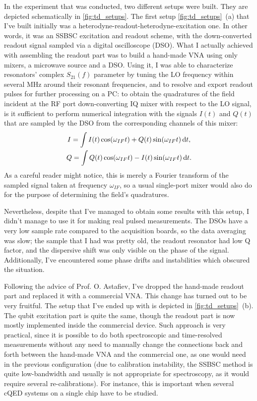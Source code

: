 In the experiment that was conducted, two different setups were built. They are depicted schematically in \autoref{fig:td_setups}. The first setup \autoref{fig:td_setups}~(a) that I've built initially was a heterodyne-readout-heterodyne-excitation one. In other words, it was an SSBSC excitation and readout scheme, with the down-converted readout signal sampled via a digital oscilloscope (DSO). What I actually achieved with assembling the readout part was to build a hand-made VNA using only mixers, a microwave source and a DSO. Using it, I was able to characterize resonators' complex $S_{21}(f)$ parameter by tuning the LO frequency within several MHz around their resonant frequencies, and to resolve and export readout pulses for further processing on a PC: to obtain the quadratures of the field incident at the RF port down-converting IQ mixer with respect to the LO signal, is it sufficient to perform numerical integration with the signals $I(t)$ and $Q(t)$ that are sampled by the DSO from the corresponding channels of this mixer:
\[
\begin{gathered}
I = \int I(t) \cos(\omega_{IF}t)+Q(t) \sin(\omega_{IF}t) \,\mathrm{d} t,\\
Q =  \int Q(t) \cos(\omega_{IF}t)-I(t) \sin(\omega_{IF}t) \,\mathrm{d} t.
\end{gathered}
\]
As a careful reader might notice, this is merely a Fourier transform of the sampled signal taken at frequency $\omega_{IF}$, so a usual single-port mixer would also do for the purpose of determining the field's quadratures. 

Nevertheless, despite that I've managed to obtain some results with this setup, I didn't manage to use it for making real pulsed measurements. The DSOs have a very low sample rate compared to the acquisition boards, so the data averaging was slow; the sample that I had was pretty old, the readout resonator had low Q factor, and the dispersive shift was only visible on the phase of the signal. Additionally, I've encountered some phase drifts and instabilities which obscured the situation. 

Following the advice of Prof. O. Astafiev, I've dropped the hand-made readout part and replaced it with a commercial VNA. This change has turned out to be very fruitful. The setup that I've ended up with is depicted in \autoref{fig:td_setups}~(b). The qubit excitation part is quite the same, though the readout part is now mostly implemented inside the commercial device. Such approach is very practical, since it is possible to do both spectroscopic and time-resolved measurements without any need to manually change the connections back and forth between the hand-made VNA and the commercial one, as one would need in the previous configuration (due to calibration instability, the SSBSC method is quite low-bandwidth and usually is not appropriate for spectroscopy, as it would require several re-calibrations). For instance, this is important when several cQED systems on a single chip have to be studied.


